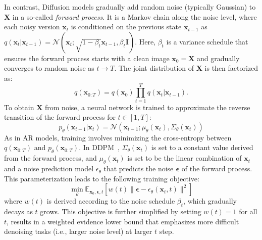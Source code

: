 In contrast, Diffusion models gradually add random noise (typically Gaussian) to $\mathbf{X}$ in a so-called \textit{forward process}. It is a Markov chain along the noise level, where each noisy version $\mathbf{x}_t$ is conditioned on the previous state $ \mathbf{x}_{t-1} $ as $ q(\mathbf{x}_t | \mathbf{x}_{t-1}) = \mathcal{N}(\mathbf{x}_t; \sqrt{1 - \beta_t} \mathbf{x}_{t-1}, \beta_t \mathbf{I}) $. Here, $ \beta_t $ is a variance schedule that ensures the forward process starts with a clean image $ \mathbf{x}_0 = \mathbf{X} $ and gradually converges to random noise as $ t \rightarrow T $. The joint distribution of $ \mathbf{X} $ is then factorized as: 
\begin{equation}\label{eq:diffusion-factorization}
q(\mathbf{x}_{0:T}) = q(\mathbf{x}_0)\prod_{t=1}^T q(\mathbf{x}_t | \mathbf{x}_{t-1}).
\end{equation}
To obtain $ \mathbf{X} $ from noise, a neural network is trained to approximate the reverse transition of the forward process for $ t \in [1, T] $:
\begin{equation}\label{eq:diffusion-reverse}
p_\theta(\mathbf{x}_{t-1} | \mathbf{x}_t) = \mathcal{N}(\mathbf{x}_{t-1}; {\mu_\theta}(\mathbf{x}_t), \Sigma_\theta(\mathbf{x}_t))
\end{equation}
As in AR models, training involves minimizing the cross-entropy between $ q(\mathbf{x}_{0:T}) $ and $p_\theta(\mathbf{x}_{0:T})$. 
In DDPM~\cite{ddpm}, $\Sigma_\theta(\mathbf{x}_t)$ is set to a constant value derived from the forward process, and $\mu_\theta(\mathbf{x}_t)$ is set to be the linear combination of $\mathbf{x}_t$ and a noise prediction model $\epsilon_\theta$ that predicts the noise $\mathbf{\epsilon}$ of the forward process. This parameterization leads to the following training objective:
\begin{equation}\label{eq:diffusion_loss}
    \min_\theta \mathbb{E}_{\mathbf{x}_0, \mathbf{\epsilon}, t}[w(t) \|\mathbf{\epsilon} - \epsilon_\theta(\mathbf{x}_t, t)\|^2] 
\end{equation}
where $w(t)$ is derived according to the noise schedule $\beta_t$, which gradually decays as $t$ grows. This objective is further simplified by setting $w(t) = 1$ for all $t$, results in a weighted evidence lower bound that emphasizes more difficult denoising tasks (i.e., larger noise level) at larger $t$ step. 



